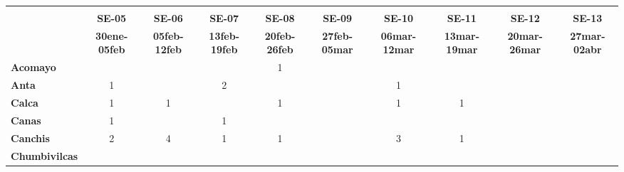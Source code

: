\begin{tabular}{lccccccccc}
	\textbf{}              	  & \multicolumn{1}{l}{}                        & \multicolumn{1}{l}{}      & \multicolumn{1}{l}{}                         & \multicolumn{1}{l}{}                         & \multicolumn{1}{l}{}                         & \multicolumn{1}{l}{}                        & \multicolumn{1}{l}{}                         & \multicolumn{1}{l}{}                         & \multicolumn{1}{l}{}     \\
	\textbf{}                                                                          
	&\textbf{SE-05}	
	&\textbf{SE-06}								&\textbf{SE-07}				&\textbf{SE-08}
	&\textbf{SE-09}								&\textbf{SE-10}
	&\textbf{SE-11}								&\textbf{SE-12}
	&\textbf{SE-13}\\
	\textbf{}              	  	
	&\textbf{30ene-05feb}
	&\textbf{05feb-12feb}						&\textbf{13feb-19feb}
	&\textbf{20feb-26feb}						&\textbf{27feb-05mar}
	&\textbf{06mar-12mar}						&\textbf{13mar-19mar}
	&\textbf{20mar-26mar}						&\textbf{27mar-02abr}\\
	\textbf{Acomayo}                        		
	&\cellcolor[HTML]{FCC46C}					&\cellcolor[HTML]{FCC46C}
	&\cellcolor[HTML]{FCC46C}					&1
	&\cellcolor[HTML]{FCC46C}					&\cellcolor[HTML]{FCC46C} 
	&\cellcolor[HTML]{FCC46C}					&\cellcolor[HTML]{FCC46C}
	&\cellcolor[HTML]{FCC46C}\\
	\textbf{Anta}                                                   			
	&1											&\cellcolor[HTML]{FCC46C}					&2
	&\cellcolor[HTML]{FCC46C}					&\cellcolor[HTML]{FCC46C}					&1
	&\cellcolor[HTML]{FCC46C}					&\cellcolor[HTML]{FCC46C}
	&\cellcolor[HTML]{FCC46C}\\
	\textbf{Calca}      				       								            
	&1 											&1	
	&\cellcolor[HTML]{FCC46C}					&1											&\cellcolor[HTML]{FCC46C} 				&1											&1	
	&\cellcolor[HTML]{FCC46C}		   	&\cellcolor[HTML]{FCC46C}\\             			
	\textbf{Canas}                              		
	&1											&\cellcolor[HTML]{FCC46C}
	&1											&\cellcolor[HTML]{FCC46C}
	&\cellcolor[HTML]{FCC46C}					&\cellcolor[HTML]{FCC46C}
	&\cellcolor[HTML]{FCC46C} 					&\cellcolor[HTML]{FCC46C}
	&\cellcolor[HTML]{FCC46C}\\
	\textbf{Canchis}                             		
	&2											&4
	&1											&1
	&\cellcolor[HTML]{FCC46C}					&3
	&1											&\cellcolor[HTML]{FCC46C}
	&\cellcolor[HTML]{FCC46C}\\
	\textbf{Chumbivilcas}                      			

\end{tabular}
